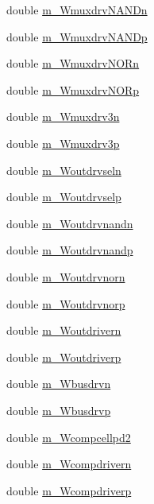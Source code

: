 \begin{DoxyCompactItemize}
\item 
double \hyperlink{classTechParameter_a8d6b4f292c1b9d2c7cf6a3bf1b2cd8fc}{m\_\-WmuxdrvNANDn}
\item 
double \hyperlink{classTechParameter_a3b6c56b587e3133b3413d38763a88cb8}{m\_\-WmuxdrvNANDp}
\item 
double \hyperlink{classTechParameter_a85f2dfa6c57f3f7343012fd00c91f393}{m\_\-WmuxdrvNORn}
\item 
double \hyperlink{classTechParameter_a4f47a19ede532bb8efb3be254ebe0e9f}{m\_\-WmuxdrvNORp}
\item 
double \hyperlink{classTechParameter_a47d7428b310cfd62b07b8cd757de20f3}{m\_\-Wmuxdrv3n}
\item 
double \hyperlink{classTechParameter_a892da424941c29559e6c15a371d6bcb8}{m\_\-Wmuxdrv3p}
\item 
double \hyperlink{classTechParameter_aa03eb78cd21e3374856d729f7b23f3e4}{m\_\-Woutdrvseln}
\item 
double \hyperlink{classTechParameter_a5469cd10701b5cbbaffa51979fda36f1}{m\_\-Woutdrvselp}
\item 
double \hyperlink{classTechParameter_aa1644fd8fe9cdc043da7b7d867d7280e}{m\_\-Woutdrvnandn}
\item 
double \hyperlink{classTechParameter_a5f3ebf1a89a15597b4e5a7703a13a49d}{m\_\-Woutdrvnandp}
\item 
double \hyperlink{classTechParameter_a752bb450b01abafdbedfdae5bf7c7e85}{m\_\-Woutdrvnorn}
\item 
double \hyperlink{classTechParameter_a8f9f0acfb37dcf07ea91716dfce4f734}{m\_\-Woutdrvnorp}
\item 
double \hyperlink{classTechParameter_a7a4504cc86b85613c8f36ff67052ce7a}{m\_\-Woutdrivern}
\item 
double \hyperlink{classTechParameter_a77826473c4dbd5c819c1449f1de82616}{m\_\-Woutdriverp}
\item 
double \hyperlink{classTechParameter_ade2d93dbd2d0d25553fb1aa0124ead6b}{m\_\-Wbusdrvn}
\item 
double \hyperlink{classTechParameter_a51ec8c7d0a7e388c3c051838cb6a15ae}{m\_\-Wbusdrvp}
\item 
double \hyperlink{classTechParameter_a9b6a23e8338c5d278ba1ab8b4c62c98c}{m\_\-Wcompcellpd2}
\item 
double \hyperlink{classTechParameter_a5a44ed4ce59c0151bf8c87b3526f7816}{m\_\-Wcompdrivern}
\item 
double \hyperlink{classTechParameter_a2c7553518412a0368b45fb6f1132b574}{m\_\-Wcompdriverp}

\end{DoxyCompactItemize}
